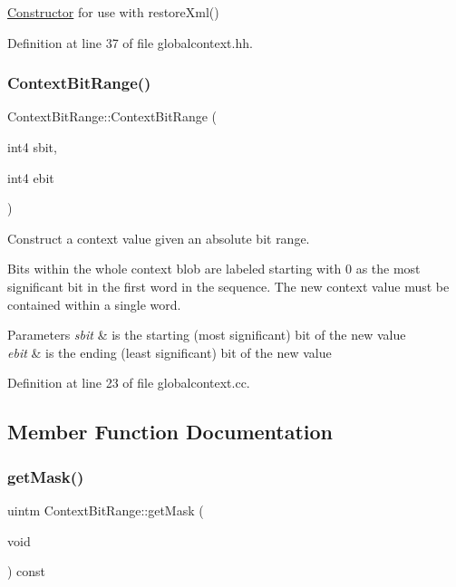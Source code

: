 \mbox{\hyperlink{class_constructor}{Constructor}} for use with restore\+Xml() 



Definition at line 37 of file globalcontext.\+hh.

\mbox{\label{class_context_bit_range_ae4e8074485bbd3561ecbbb2e18787931}} 
\subsubsection{\texorpdfstring{ContextBitRange()}{ContextBitRange()}\hspace{0.1cm}{\footnotesize\ttfamily [2/2]}}
{\footnotesize\ttfamily Context\+Bit\+Range\+::\+Context\+Bit\+Range (\begin{DoxyParamCaption}\item[{int4}]{sbit,  }\item[{int4}]{ebit }\end{DoxyParamCaption})}



Construct a context value given an absolute bit range. 

Bits within the whole context blob are labeled starting with 0 as the most significant bit in the first word in the sequence. The new context value must be contained within a single word. 
\begin{DoxyParams}{Parameters}
{\em sbit} & is the starting (most significant) bit of the new value \\
\hline
{\em ebit} & is the ending (least significant) bit of the new value \\
\hline
\end{DoxyParams}


Definition at line 23 of file globalcontext.\+cc.



\subsection{Member Function Documentation}
\mbox{\label{class_context_bit_range_a69aa9a59ac5d327aa1d06b11b253e6a0}} 
\subsubsection{\texorpdfstring{getMask()}{getMask()}}
{\footnotesize\ttfamily uintm Context\+Bit\+Range\+::get\+Mask (\begin{DoxyParamCaption}\item[{void}]{ }\end{DoxyParamCaption}) const\hspace{0.3cm}{\ttfamily [inline]}}



